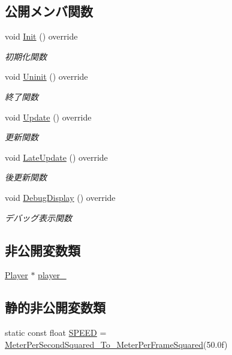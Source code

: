 \subsection*{公開メンバ関数}
\begin{DoxyCompactItemize}
\item 
void \mbox{\hyperlink{class_player_update_ac72b39db7b7bfaf094bde9ed1adef4b7}{Init}} () override
\begin{DoxyCompactList}\small\item\em 初期化関数 \end{DoxyCompactList}\item 
void \mbox{\hyperlink{class_player_update_a997e0813a825d7525da4b5b89a290168}{Uninit}} () override
\begin{DoxyCompactList}\small\item\em 終了関数 \end{DoxyCompactList}\item 
void \mbox{\hyperlink{class_player_update_af6e1b8ca60399f232e64d2acb4968c75}{Update}} () override
\begin{DoxyCompactList}\small\item\em 更新関数 \end{DoxyCompactList}\item 
void \mbox{\hyperlink{class_player_update_ae376f517f3458edfef61ac366aa78e36}{Late\+Update}} () override
\begin{DoxyCompactList}\small\item\em 後更新関数 \end{DoxyCompactList}\item 
void \mbox{\hyperlink{class_player_update_ac15fd0faf356c6e66f6c62c2b6b8d3ac}{Debug\+Display}} () override
\begin{DoxyCompactList}\small\item\em デバッグ表示関数 \end{DoxyCompactList}\end{DoxyCompactItemize}
\subsection*{非公開変数類}
\begin{DoxyCompactItemize}
\item 
\mbox{\hyperlink{class_player}{Player}} $\ast$ \mbox{\hyperlink{class_player_update_abd75bd3c4e3ecc2863e272a5e14b677f}{player\+\_\+}}
\end{DoxyCompactItemize}
\subsection*{静的非公開変数類}
\begin{DoxyCompactItemize}
\item 
static const float \mbox{\hyperlink{class_player_update_ade4f68ed032e187334cc2e3922e365c5}{S\+P\+E\+ED}} = \mbox{\hyperlink{_meter_to_frame_8h_a3a2c155748ceb2eab2a3c303ae48ecc0}{Meter\+Per\+Second\+Squared\+\_\+\+To\+\_\+\+Meter\+Per\+Frame\+Squared}}(50.\+0f)
\end{DoxyCompactItemize}


